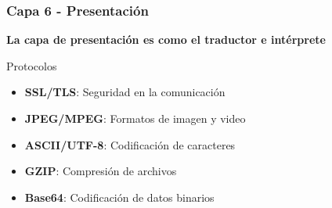 \documentclass[aspectratio=169]{beamer}
\begin{document}
            \begin{frame}
              \frametitle{Capa 6 - Presentación}
              
              \begin{center}
              \Large \textbf{La capa de presentación es como el traductor e intérprete}
              \end{center}
              
            
              
              \begin{block}{Protocolos}
              \begin{itemize}
              \item \textbf{SSL/TLS}: Seguridad en la comunicación
              \item \textbf{JPEG/MPEG}: Formatos de imagen y video
              \item \textbf{ASCII/UTF-8}: Codificación de caracteres
              \item \textbf{GZIP}: Compresión de archivos
              \item \textbf{Base64}: Codificación de datos binarios
              \end{itemize}
              \end{block}
              
              \end{frame}
\end{document}
